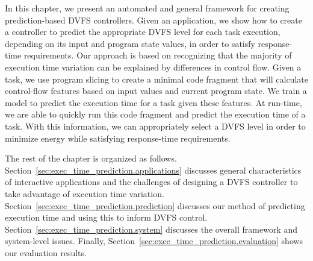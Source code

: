 In this chapter, we present an automated and general framework for creating
prediction-based DVFS controllers. Given an application, we show how to create
a controller to predict the appropriate DVFS level for each task execution,
depending on its input and program state values, in order to satisfy
response-time requirements. Our approach is based on recognizing that the
majority of execution time variation can be explained by differences in control
flow.  Given a task, we use program slicing to create a minimal code fragment
that will calculate control-flow features based on input values and current
program state. We train a model to predict the execution time for a task given
these features. At run-time, we are able to quickly run this code fragment and
predict the execution time of a task. With this information, we can
appropriately select a DVFS level in order to minimize energy while satisfying
response-time requirements.  


The rest of the chapter is organized as follows.
Section~\ref{sec:exec_time_prediction.applications} discusses general
characteristics of interactive applications and the challenges of designing a
DVFS controller to take advantage of execution time variation.
Section~\ref{sec:exec_time_prediction.prediction} discusses our method of
predicting execution time and using this to inform DVFS control.
Section~\ref{sec:exec_time_prediction.system} discusses the overall framework
and system-level issues. Finally, Section~\ref{sec:exec_time_prediction.evaluation}
shows our evaluation results. 
